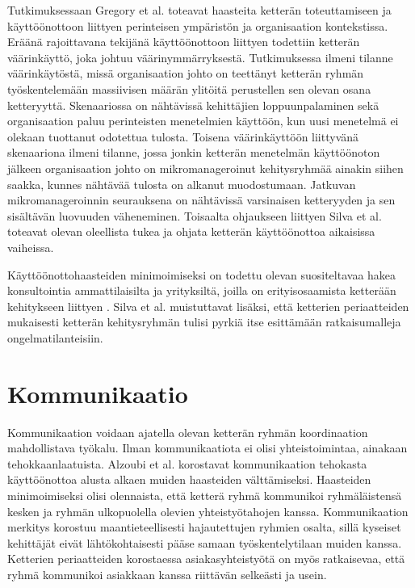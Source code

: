 Tutkimuksessaan Gregory et al. \cite{GREGORY201692} toteavat haasteita ketterän toteuttamiseen ja käyttöönottoon liittyen perinteisen ympäristön ja organisaation kontekstissa. Eräänä rajoittavana tekijänä käyttöönottoon liittyen todettiin ketterän väärinkäyttö, joka johtuu väärinymmärryksestä. Tutkimuksessa ilmeni tilanne väärinkäytöstä, missä organisaation johto on teettänyt ketterän ryhmän työskentelemään massiivisen määrän ylitöitä perustellen sen olevan osana ketteryyttä. Skenaariossa on nähtävissä kehittäjien loppuunpalaminen sekä organisaation paluu perinteisten menetelmien käyttöön, kun uusi menetelmä ei olekaan tuottanut odotettua tulosta. Toisena väärinkäyttöön liittyvänä skenaariona ilmeni tilanne, jossa jonkin ketterän menetelmän käyttöönoton jälkeen organisaation johto on mikromanageroinut kehitysryhmää ainakin siihen saakka, kunnes nähtävää tulosta on alkanut muodostumaan. Jatkuvan mikromanageroinnin seurauksena on nähtävissä varsinaisen ketteryyden ja sen sisältävän luovuuden väheneminen. Toisaalta ohjaukseen liittyen Silva et al. \cite{SELLERISILVA201520} toteavat olevan oleellista tukea ja ohjata ketterän käyttöönottoa aikaisissa vaiheissa.

Käyttöönottohaasteiden minimoimiseksi on todettu olevan suositeltavaa hakea konsultointia ammattilaisilta ja yrityksiltä, joilla on erityisosaamista ketterään kehitykseen liittyen \cite{SELLERISILVA201520}. Silva et al. \cite{SELLERISILVA201520} muistuttavat lisäksi, että ketterien periaatteiden mukaisesti ketterän kehitysryhmän tulisi pyrkiä itse esittämään ratkaisumalleja ongelmatilanteisiin.

\section{Kommunikaatio}

Kommunikaation voidaan ajatella olevan ketterän ryhmän koordinaation mahdollistava työkalu. Ilman kommunikaatiota ei olisi yhteistoimintaa, ainakaan tehokkaanlaatuista. Alzoubi et al. \cite{ALZOUBI201622} korostavat kommunikaation tehokasta käyttöönottoa alusta alkaen muiden haasteiden välttämiseksi. Haasteiden minimoimiseksi olisi olennaista, että ketterä ryhmä kommunikoi ryhmäläistensä kesken ja ryhmän ulkopuolella olevien yhteistyötahojen kanssa. Kommunikaation merkitys korostuu maantieteellisesti hajautettujen ryhmien osalta, sillä kyseiset kehittäjät eivät lähtökohtaisesti pääse samaan työskentelytilaan muiden kanssa. Ketterien periaatteiden korostaessa asiakasyhteistyötä on myös ratkaisevaa, että ryhmä kommunikoi asiakkaan kanssa riittävän selkeästi ja usein.

